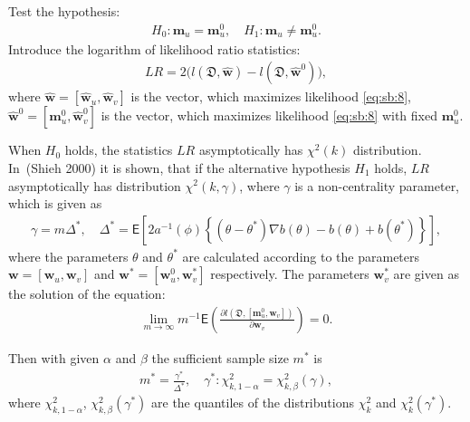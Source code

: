 \documentclass[
11pt,%
tightenlines,%
twoside,%
onecolumn,%
nofloats,%
nobibnotes,%
nofootinbib,%
superscriptaddress,%
noshowpacs,%
centertags]%
{revtex4}
\begin{document}
Test the hypothesis:
\begin{equation}
\label{eq:sb:9}
\begin{aligned}
	H_0: \textbf{m}_{u} = \textbf{m}^0_{u}, \quad H_1: \textbf{m}_{u} \not= \textbf{m}^0_{u}.
\end{aligned}
\end{equation}
Introduce the logarithm of likelihood ratio statistics:
\begin{equation}
\label{eq:sb:10}
\begin{aligned}
	LR = 2\Big(l\left(\mathfrak{D}, \hat{\textbf{w}}\right) - l\left(\mathfrak{D}, \hat{\textbf{w}}^0\right)\Big),
\end{aligned}
\end{equation}
where $\hat{\textbf{w}} = [\hat{\textbf{w}}_{u},\hat{\textbf{w}}_{v}]$ is the vector, which maximizes likelihood \eqref{eq:sb:8}, $\hat{\textbf{w}}^{0} = [\textbf{m}^{0}_{u},\hat{\textbf{w}}^{0}_{v}]$ is the vector, which maximizes likelihood \eqref{eq:sb:8} with fixed $\textbf{m}^{0}_{u}$.
	
When $H_0$ holds, the statistics $LR$ asymptotically has $\chi^2(k)$ distribution. In~(Shieh 2000) it is shown, that if the alternative hypothesis $H_1$ holds, $LR$ asymptotically has distribution $\chi^2(k,\gamma)$, where $\gamma$ is a non-centrality parameter, which is given as
\begin{equation}
\label{eq:sb:11}
\begin{aligned}
	\gamma = m\Delta^*, \quad \Delta^* = \mathsf{E}\left[2a^{-1}(\phi)\left\{\left(\theta - \theta^*\right)\nabla b(\theta) - b(\theta) + b(\theta^*)\right\}\right], 
\end{aligned}
\end{equation}
where the parameters $\theta$ and $\theta^*$ are calculated according to the parameters $\textbf{w} = [\textbf{w}_{u}, \textbf{w}_{v}]$ and $\textbf{w}^* = [\textbf{w}^{0}_{u}, \textbf{w}^{*}_{v}]$ respectively. The parameters  $\textbf{w}^{*}_{v}$ are given as the solution of the equation:
\begin{equation}
\label{eq:sb:12}
\begin{aligned}
	\lim_{m\to\infty}m^{-1}\mathsf{E}\left(\frac{\partial l\left(\mathfrak{D}, \left[\textbf{m}^{0}_{u}, \textbf{w}_{v}\right]\right)}{\partial \textbf{w}_{v}}\right) = 0.
\end{aligned}
\end{equation}
	
Then with given $\alpha$ and $\beta$ the sufficient sample size $m^*$ is
\begin{equation}
\label{eq:sb:13}
\begin{aligned}
	m^* = \frac{\gamma^*}{\Delta^*}, \quad \gamma^*:\chi^2_{k, 1-\alpha} = \chi^2_{k, \beta}\left(\gamma\right), 
\end{aligned}
\end{equation}
where $\chi^2_{k, 1-\alpha}$, $\chi^2_{k, \beta}\left(\gamma^*\right)$ are the quantiles of the distributions $\chi^{2}_k$ and $\chi^2_{k}\left(\gamma^*\right)$.
	
\end{document}

